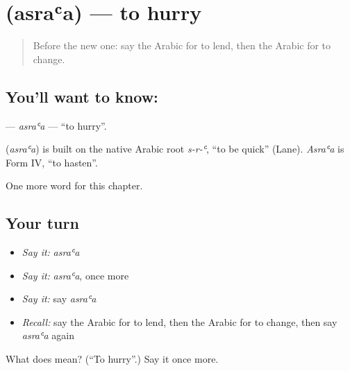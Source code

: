 \section[\texorpdfstring{\ar{أسرع} (asraʿa)}{أسرع (asraʿa)}]{ (asraʿa) — to hurry}

\label{lesson:AR-C224-asraa}



\begin{quote}
Before the new one: say the Arabic for to lend, then the Arabic for to change.
\end{quote}

\subsection*{You'll want to know: }
\textbf{} — \emph{asraʿa} — \textquotedblleft{}to hurry\textquotedblright{}.

\begin{cousinweb}
\textbf{} (\emph{asraʿa}) is built on the native Arabic root \emph{s-r-ʿ}, \textquotedblleft{}to be quick\textquotedblright{} (Lane). \emph{Asraʿa} is Form IV, \textquotedblleft{}to hasten\textquotedblright{}.
\end{cousinweb}

\begin{grammarlens}[title={What you've built}]
One more word for this chapter.
\end{grammarlens}

\subsection*{Your turn}
\begin{itemize}
\raggedright
  \item \emph{Say it:} \emph{asraʿa}
  \item \emph{Say it:} \emph{asraʿa}, once more
  \item \emph{Say it:} say \emph{asraʿa}
  \item \emph{Recall:} say the Arabic for to lend, then the Arabic for to change, then say \emph{asraʿa} again
\end{itemize}

\begin{tcolorbox}[breakable,colback=teal!4,colframe=teal!35!black,title={Before you move on}]
What does  mean? (\textquotedblleft{}To hurry\textquotedblright{}.) Say it once more.
\end{tcolorbox}
